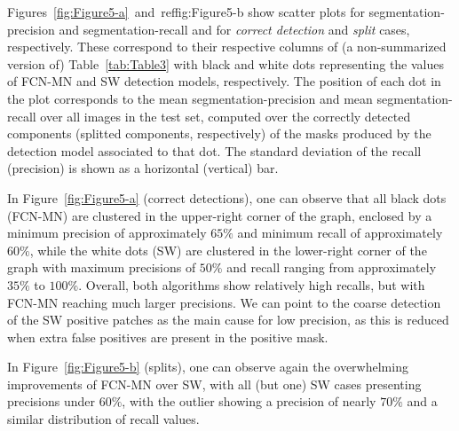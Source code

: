 \documentclass[a4paper,authoryear,review]{elsarticle}
\begin{document}
	Figures~\ref{fig:Figure5-a}~and~ref{fig:Figure5-b} show scatter plots for segmentation-precision and segmentation-recall and for \emph{correct detection} and \emph{split} cases, respectively. These correspond to their respective columns of (a non-summarized version of) Table~\ref{tab:Table3} with black and white dots representing the values of FCN-MN and SW detection models, respectively. The position of each dot in the plot corresponds to the mean segmentation-precision and mean segmentation-recall over all images in the test set, computed over the correctly detected components (splitted components, respectively) of the masks produced by the detection model associated to that dot. The standard deviation of the recall (precision) is shown as a horizontal (vertical) bar.
	
	In Figure~\ref{fig:Figure5-a} (correct detections), one can observe that all black dots (FCN-MN) are clustered in the upper-right corner of the graph, enclosed by a minimum precision of approximately $65\%$ and minimum recall of approximately $60\%$, while the white dots (SW) are clustered in the lower-right corner of the graph with maximum precisions of $50\%$ and recall ranging from approximately $35\%$ to $100\%$. Overall, both algorithms show relatively high recalls, but with FCN-MN reaching much larger precisions. We can point to the coarse detection of the SW positive patches as the main cause for low precision, as this is reduced when extra false positives are present in the positive mask. 
	
	In Figure~\ref{fig:Figure5-b} (splits), one can observe again the overwhelming improvements of FCN-MN over SW, with all (but one) SW cases presenting precisions under $60\%$, with the outlier showing a precision of nearly  $70\%$ and a similar distribution of recall values.  
	
\end{document}
